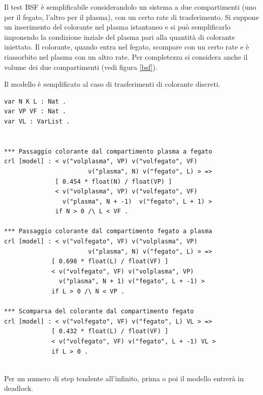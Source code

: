 Il test BSF \cite{gnudi} è semplificabile considerandolo un sistema a due compartimenti
(uno per il fegato, l'altro per il plasma), con un certo rate di trasferimento. Si
suppone un inserimento del colorante nel plasma istantaneo e si può
semplificarlo imponendo la condizione inziale del plasma pari alla quantità di
colorante iniettato. Il colorante, quando entra nel fegato, scompare con un
certo rate e è riassorbito nel plasma con un altro rate. Per completezza si
considera anche il volume dei due compartimenti (vedi figura \ref{bsf}).

Il modello è semplificato al caso di trasferimenti di colorante discreti.

\begin{verbatim}
var N K L : Nat .
var VP VF : Nat .
var VL : VarList .
	
	
*** Passaggio colorante dal compartimento plasma a fegato
crl [model] : < v("volplasma", VP) v("volfegato", VF)
                       v("plasma", N) v("fegato", L) > =>
              [ 0.454 * float(N) / float(VP) ]
              < v("volplasma", VP) v("volfegato", VF)
                v("plasma", N + -1)  v("fegato", L + 1) >
              if N > 0 /\ L < VF .

*** Passaggio colorante dal compartimento fegato a plasma            
crl [model] : < v("volfegato", VF) v("volplasma", VP)
                       v("plasma", N) v("fegato", L) > =>
             [ 0.698 * float(L) / float(VF) ]
             < v("volfegato", VF) v("volplasma", VP)
               v("plasma", N + 1) v("fegato", L + -1) >
             if L > 0 /\ N < VP .
		
*** Scomparsa del colorante dal compartimento fegato
crl [model] : < v("volfegato", VF) v("fegato", L) VL > =>
             [ 0.432 * float(L) / float(VF) ]
             < v("volfegato", VF) v("fegato", L + -1) VL >
             if L > 0 .
	
\end{verbatim}

Per un numero di step tendente all'infinito, prima o poi il modello entrerà in
deadlock.










